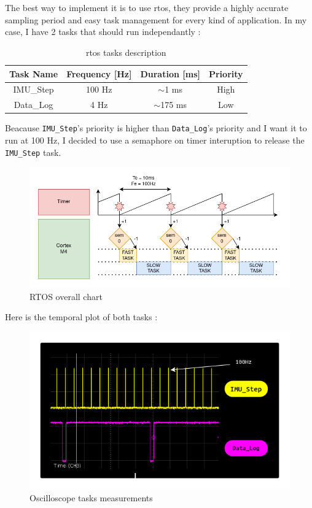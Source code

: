 \\ \\
The best way to implement it is to use \gls{rtos}, they provide a highly accurate sampling period and easy task management for every kind of application. In my case, I have 2 tasks that should run independantly :
\begin{table}[H]
    \centering
    \begin{tabular}{|c||c|c|c|}
    \hline
    Task Name & Frequency {[}Hz{]} & Duration {[}ms{]} & Priority \\ \hline
    IMU\_Step & 100 Hz             & $\sim$1 ms        & High     \\ \hline
    Data\_Log   & 4 Hz             & $\sim$175 ms      & Low      \\ \hline
    \end{tabular}
    \caption{\gls{rtos} tasks description}
    \label{table:tasks_details}
\end{table}

Beacause \texttt{IMU\_Step}'s priority is higher than \texttt{Data\_Log}'s priority and I want it to run at 100 Hz, I decided to use a semaphore on timer interuption to release the \texttt{IMU\_Step} task.
\begin{figure}[H]
    \centering
    \includegraphics[width=0.75\linewidth]{./projects/pmodnav/rtos_overall.png}
    \caption{RTOS overall chart}
    \label{fig:rtos_overall}
\end{figure}

Here is the temporal plot of both tasks :
\begin{figure}[H]
    \centering
    \includegraphics[width=0.75\linewidth]{./projects/pmodnav/osci_screen.png}
    \caption{Oscilloscope tasks measurements}
    \label{fig:osci_tasks}
\end{figure}

